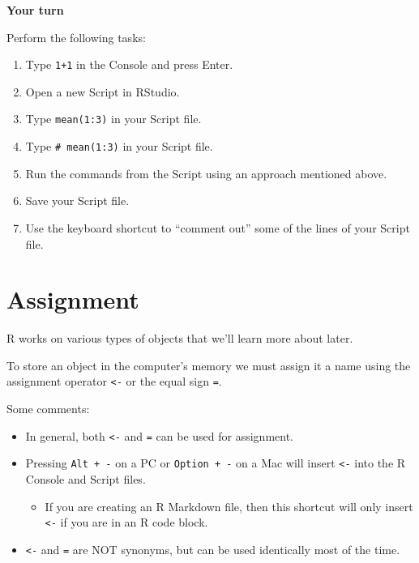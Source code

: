 \documentclass[
]{book}
\providecommand{\tightlist}{%
  \setlength{\itemsep}{0pt}\setlength{\parskip}{0pt}}
\theoremstyle{definition}
\theoremstyle{definition}
\theoremstyle{definition}
\theoremstyle{definition}
\theoremstyle{remark}
\begin{document}
\begin{yourturn}

\textbf{Your turn}

Perform the following tasks:

\begin{enumerate}
\def\labelenumi{\arabic{enumi}.}
\tightlist
\item
  Type \texttt{1+1} in the Console and press Enter.
\item
  Open a new Script in RStudio.
\item
  Type \texttt{mean(1:3)} in your Script file.
\item
  Type \texttt{\#\ mean(1:3)} in your Script file.
\item
  Run the commands from the Script using an approach mentioned above.
\item
  Save your Script file.
\item
  Use the keyboard shortcut to ``comment out'' some of the lines of your Script file.
\end{enumerate}

\end{yourturn}

\hypertarget{assignment}{%
\section{Assignment}\label{assignment}}

R works on various types of objects that we'll learn more about later.

To store an object in the computer's memory we must assign it a name using the assignment operator \texttt{\textless{}-} or the equal sign \texttt{=}.

Some comments:

\begin{itemize}
\tightlist
\item
  In general, both \texttt{\textless{}-} and \texttt{=} can be used for assignment.
\item
  Pressing \texttt{Alt\ +\ -} on a PC or \texttt{Option\ +\ -} on a Mac will insert \texttt{\textless{}-} into the R Console and Script files.

  \begin{itemize}
  \tightlist
  \item
    If you are creating an R Markdown file, then this shortcut will only insert \texttt{\textless{}-} if you are in an R code block.
  \end{itemize}
\item
  \texttt{\textless{}-} and \texttt{=} are NOT synonyms, but can be used identically most of the time.
\end{itemize}
\end{document}
